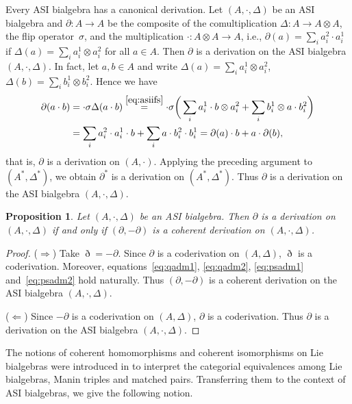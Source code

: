 \documentclass[pdftex]{sigma}
\numberwithin{equation}{section}
\newtheorem{Proposition}[Theorem]{Proposition}
{ \theoremstyle{definition}
	\newtheorem{Definition}[Theorem]{Definition}
	\newtheorem{Note}[Theorem]{Note}
	\newtheorem{Example}[Theorem]{Example}
	\newtheorem{Remark}[Theorem]{Remark} }
\begin{document}
\begin{Example}
Every ASI bialgebra has a canonical derivation.
Let $(A, \cdot, \Delta)$ be an ASI bialgebra and $\partial\colon A \to A$ be
the composite of the comultiplication $\Delta\colon A \to A \otimes A$,
the flip operator~$\sigma$, and the multiplication $\cdot\colon A \otimes A \to A$,
i.e., $\partial(a) = \sum_i a_i^2 \cdot a_i^1$ if $\Delta(a) = \sum_i a_i^1 \otimes a_i^2$
for all $a \in A$.
Then $\partial$ is a derivation on the ASI bialgebra $(A, \cdot, \Delta)$.
In fact, let $a, b \in A$ and write
$\Delta(a) = \sum_i a_i^1 \otimes a_i^2$, $\Delta(b) = \sum_i b_i^1 \otimes b_i^2$.
Hence we have
\begin{align*}
 \partial(a \cdot b) & = \cdot \sigma \Delta(a \cdot b) \overset{\eqref{eq:asiifs}}{=} \cdot \sigma \bigg(\sum_i a_i^1 \cdot b \otimes a_i^2 + \sum_i b_i^1 \otimes a \cdot b_i^2\bigg)\\
 & = \sum_i a_i^2 \cdot a_i^1 \cdot b + \sum_i a \cdot b_i^2 \cdot b_i^1 = \partial(a) \cdot b + a \cdot \partial(b),
\end{align*}
that is, $\partial$ is a derivation on $(A, \cdot)$.
Applying the preceding argument to $(A^*, \Delta^*)$,
we obtain $\partial^*$ is a derivation on $(A^*, \Delta^*)$.
Thus $\partial$ is a derivation on the ASI bialgebra $(A, \cdot, \Delta)$.
\end{Example}


\begin{Proposition}
 Let $(A, \cdot, \Delta)$ be an ASI bialgebra.
 Then $\partial$ is a derivation on $(A, \cdot, \Delta)$ if and only if $(\partial, -\partial)$ is a coherent derivation on $(A, \cdot, \Delta)$.
\end{Proposition}
\begin{proof}
 ($\Longrightarrow$)
 Take $\eth = -\partial$.
 Since $\partial$ is a coderivation on $(A, \Delta)$, $\eth$ is a coderivation.
 Moreover, equations~\eqref{eq:qadm1}, \eqref{eq:qadm2}, \eqref{eq:psadm1} and~\eqref{eq:psadm2} hold naturally.
 Thus $(\partial, -\partial)$ is a coherent derivation on the ASI bialgebra $(A, \cdot, \Delta)$.

 ($\Longleftarrow$)
 Since $-\partial$ is a coderivation on $(A, \Delta)$, $\partial$ is a coderivation.
 Thus $\partial$ is a derivation on the ASI bialgebra $(A, \cdot, \Delta)$.
\end{proof}

The notions of coherent homomorphisms and coherent isomorphisms on Lie bialgebras were introduced in \cite{BGS} to interpret the categorial equivalences among Lie bialgebras, Manin triples and matched pairs.
Transferring them to the context of ASI bialgebras, we give the following notion.
\end{document}
